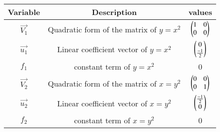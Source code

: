 \begin{tabular}[12pt]{ |c| c| c |}
    \hline
    \textbf{Variable} & \textbf{Description} & \textbf{values}\\ 
    \hline
    $\vec{V_1}$ & Quadratic form of the matrix of $y=x^2$& $\begin{pmatrix}1 & 0 \\ 0 & 0\end{pmatrix} $\\
    \hline
    $\vec{u_1}$ & Linear coefficient vector of $y=x^2$& $\begin{pmatrix}0 \\ \frac{-1}{2}\end{pmatrix} $\\
    \hline
    $f_1$ & constant term of $y=x^2$ & 0 \\ 
    \hline
   $\vec{V_2}$ & Quadratic form of the matrix of $x=y^2$& $\begin{pmatrix}0 & 0 \\ 0 & 1\end{pmatrix} $\\
    \hline
    $\vec{u_2}$ & Linear coefficient vector of $x=y^2$& $\begin{pmatrix}\frac{-1}{2} \\ 0\end{pmatrix} $\\
    \hline
    $f_2$ & constant term of $x=y^2$ & 0 \\ 
    \hline
\end{tabular}
